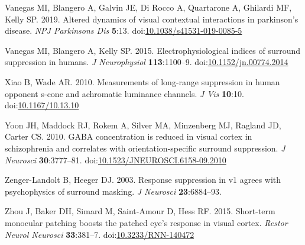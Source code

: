 \documentclass[]{article}
\begin{document}
\leavevmode\hypertarget{ref-Vanegas2019}{}%
Vanegas MI, Blangero A, Galvin JE, Di Rocco A, Quartarone A, Ghilardi MF, Kelly SP. 2019. Altered dynamics of visual contextual interactions in parkinson's disease. \emph{NPJ Parkinsons Dis} \textbf{5}:13. doi:\href{https://doi.org/10.1038/s41531-019-0085-5}{10.1038/s41531-019-0085-5}

\leavevmode\hypertarget{ref-Vanegas2015}{}%
Vanegas MI, Blangero A, Kelly SP. 2015. Electrophysiological indices of surround suppression in humans. \emph{J Neurophysiol} \textbf{113}:1100--9. doi:\href{https://doi.org/10.1152/jn.00774.2014}{10.1152/jn.00774.2014}

\leavevmode\hypertarget{ref-Xiao2010}{}%
Xiao B, Wade AR. 2010. Measurements of long-range suppression in human opponent s-cone and achromatic luminance channels. \emph{J Vis} \textbf{10}:10. doi:\href{https://doi.org/10.1167/10.13.10}{10.1167/10.13.10}

\leavevmode\hypertarget{ref-Yoon2010}{}%
Yoon JH, Maddock RJ, Rokem A, Silver MA, Minzenberg MJ, Ragland JD, Carter CS. 2010. GABA concentration is reduced in visual cortex in schizophrenia and correlates with orientation-specific surround suppression. \emph{J Neurosci} \textbf{30}:3777--81. doi:\href{https://doi.org/10.1523/JNEUROSCI.6158-09.2010}{10.1523/JNEUROSCI.6158-09.2010}

\leavevmode\hypertarget{ref-Zenger-Landolt2003}{}%
Zenger-Landolt B, Heeger DJ. 2003. Response suppression in v1 agrees with psychophysics of surround masking. \emph{J Neurosci} \textbf{23}:6884--93.

\leavevmode\hypertarget{ref-Zhou2015}{}%
Zhou J, Baker DH, Simard M, Saint-Amour D, Hess RF. 2015. Short-term monocular patching boosts the patched eye's response in visual cortex. \emph{Restor Neurol Neurosci} \textbf{33}:381--7. doi:\href{https://doi.org/10.3233/RNN-140472}{10.3233/RNN-140472}
\end{document}
